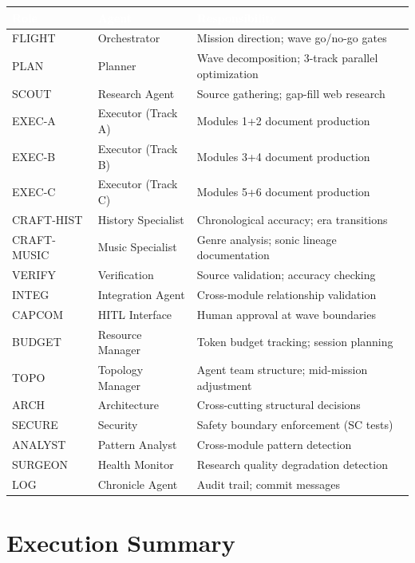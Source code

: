 \documentclass[11pt,letterpaper]{article}
\newcommand{\tableheader}[1]{\textbf{\sffamily\textcolor{white}{#1}}}
\begin{document}
\begin{center}
\begin{tabularx}{\textwidth}{L{2cm}L{2.5cm}X}
\toprule
{}
\tableheader{Role} & \tableheader{Agent} & \tableheader{Responsibility} \\
\midrule
FLIGHT & Orchestrator & Mission direction; wave go/no-go gates \\
PLAN & Planner & Wave decomposition; 3-track parallel optimization \\
SCOUT & Research Agent & Source gathering; gap-fill web research \\
EXEC-A & Executor (Track A) & Modules 1+2 document production \\
EXEC-B & Executor (Track B) & Modules 3+4 document production \\
EXEC-C & Executor (Track C) & Modules 5+6 document production \\
CRAFT-HIST & History Specialist & Chronological accuracy; era transitions \\
CRAFT-MUSIC & Music Specialist & Genre analysis; sonic lineage documentation \\
VERIFY & Verification & Source validation; accuracy checking \\
INTEG & Integration Agent & Cross-module relationship validation \\
CAPCOM & HITL Interface & Human approval at wave boundaries \\
BUDGET & Resource Manager & Token budget tracking; session planning \\
TOPO & Topology Manager & Agent team structure; mid-mission adjustment \\
ARCH & Architecture & Cross-cutting structural decisions \\
SECURE & Security & Safety boundary enforcement (SC tests) \\
ANALYST & Pattern Analyst & Cross-module pattern detection \\
SURGEON & Health Monitor & Research quality degradation detection \\
LOG & Chronicle Agent & Audit trail; commit messages \\
\bottomrule
\end{tabularx}
\end{center}

\section{Execution Summary}
\end{document}
